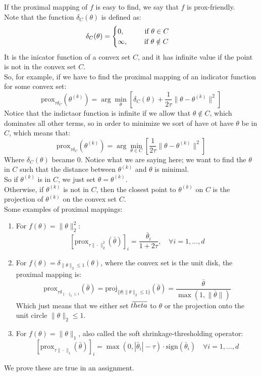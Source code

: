 \documentclass[12pt]{article}
\begin{document}
If the proximal mapping of $f$ is easy to find,
we say that $f$ is prox-friendly. \\

Note that the function $\delta_C(\theta)$
is defined as:
\[ \delta_C(\theta)
= \begin{cases} 
    0, \qquad \;\; \text{ if }  \theta \in C \\
    \infty, \qquad \text{ if } \theta \notin C
 \end{cases} \]
It is the inicator function of a convex set $C$,
and it has infinite value if the point
is not in the convex set $C$. \\

So, for example, if we have
to find the proximal mapping of an indicator
function for some convex set:
\[ \text{prox}_{\tau \delta_C}(\theta^{(k)})
= \arg\min_{\theta} \left[ \delta_C(\theta) 
+ \frac{1}{2\tau} \|\theta - \theta^{(k)}\|^2 
\right] \]
Notice that the indictaor function is infinite
if we allow that $\theta \notin C$,
which dominates all other terms, so in order
to minimize we sort of have ot have $\theta$
be in $C$, which means that:
\[ \text{prox}_{\tau \delta_C}(\theta^{(k)})
= \arg\min_{\theta \in C} \left[ \frac{1}{2\tau} 
\|\theta - \theta^{(k)}\|^2 \right] \]
Where $\delta_C(\theta)$ became $0$.
Notice what we are saying here;
we want to find the $\theta$
in $C$ such that the distance between 
$\theta^{(k)}$ and $\theta$ is minimal. \\
So if $\theta^{(k)}$ is in $C$,
we just set $\theta = \theta^{(k)}$. \\
Otherwise, if $\theta^{(k)}$ is not in $C$,
then the closest point to $\theta^{(k)}$
on $C$ is the projection of $\theta^{(k)}$
on the convex set $C$. \\

Some examples of proximal mappings:
\begin{enumerate}
    \item For $f(\theta) = \|\theta\|^2_2$:
    \[ \left[ \text{prox}_{\tau \|\cdot\|_2^2}
    (\bar{\theta}) \right]_i = 
    \frac{\bar{\theta}_i}{1 + 2\tau}, 
    \quad \forall i = 1, \ldots, d \]
    \item For $f(\theta) = 
    \delta_{\|\theta \|_2 \leq 1}(\theta)$,
    where the convex set is the unit disk,
    the proximal mapping is:
    \[ \text{prox}_{\tau \delta_{\|\cdot\|_2 \leq 1}}
    (\bar{\theta}) = \text{proj}_{\{\theta \mid 
    \|\theta\|_2 \leq 1\}}
    (\bar{\theta}) = \frac{\bar{\theta}}
    {\max(1, \|\bar{\theta}\|)}\]
    Which just means that we either set
    $\,\overline{\!{theta}}$ to $\theta$ or the projection
    onto the unit circle $\|\theta\|_2 \leq 1$.
    \item For $f(\theta) = \|\theta\|_1$,
    also called the soft shrinkage-thresholding 
    operator:
    \[ \left[ \text{prox}_{\tau \|\cdot\|_1}
    (\bar{\theta}) \right]_i = 
    \max(0, |\bar{\theta}_i| - \tau) \cdot 
    \text{sign}(\bar{\theta}_i) 
    \quad \forall i = 1, \ldots, d \]
\end{enumerate}
We prove these are true in an assignment. \\
\end{document}
